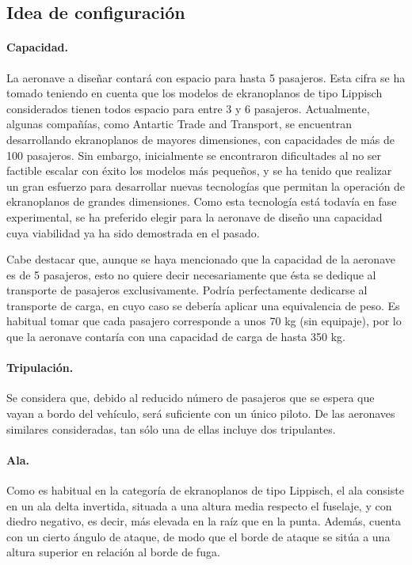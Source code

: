 \FloatBarrier

\subsection{Idea de configuración}
\label{sec:design:config}

\paragraph{Capacidad.} La aeronave a diseñar contará con espacio para hasta 5 pasajeros. Esta cifra se ha tomado teniendo en cuenta que los modelos de ekranoplanos de tipo Lippisch considerados tienen todos espacio para entre 3 y 6 pasajeros. Actualmente, algunas compañías, como Antartic Trade and Transport, se encuentran desarrollando ekranoplanos de mayores dimensiones, con capacidades de más de 100 pasajeros. Sin embargo, inicialmente se encontraron dificultades al no ser factible escalar con éxito los modelos más pequeños, y se ha tenido que realizar un gran esfuerzo para desarrollar nuevas tecnologías que permitan la operación de ekranoplanos de grandes dimensiones. Como esta tecnología está todavía en fase experimental, se ha preferido elegir para la aeronave de diseño una capacidad cuya viabilidad ya ha sido demostrada en el pasado.

Cabe destacar que, aunque se haya mencionado que la capacidad de la aeronave es de 5 pasajeros, esto no quiere decir necesariamente que ésta se dedique al transporte de pasajeros exclusivamente. Podría perfectamente dedicarse al transporte de carga, en cuyo caso se debería aplicar una equivalencia de peso. Es habitual tomar que cada pasajero corresponde a unos 70 kg (sin equipaje), por lo que la aeronave contaría con una capacidad de carga de hasta 350 kg.

\paragraph{Tripulación.} Se considera que, debido al reducido número de pasajeros que se espera que vayan a bordo del vehículo, será suficiente con un único piloto. De las aeronaves similares consideradas, tan sólo una de ellas incluye dos tripulantes.

\paragraph{Ala.} Como es habitual en la categoría de ekranoplanos de tipo Lippisch, el ala consiste en un ala delta invertida, situada a una altura media respecto el fuselaje, y con diedro negativo, es decir, más elevada en la raíz que en la punta. Además, cuenta con un cierto ángulo de ataque, de modo que el borde de ataque se sitúa a una altura superior en relación al borde de fuga.

